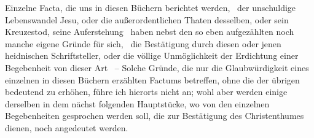 \begin{RWanm} 
Einzelne Facta, die uns in diesen Büchern berichtet werden, \zB\ der unschuldige Lebenswandel Jesu, oder die außerordentlichen Thaten desselben, oder sein Kreuzestod, seine Auferstehung \udgl\  haben nebst den so eben aufgezählten noch manche eigene Gründe für sich, \zB\ die Bestätigung durch diesen oder jenen heidnischen Schriftsteller, oder die völlige Unmöglichkeit der Erdichtung einer Begebenheit von dieser Art \udgl\  -- Solche Gründe, die nur die Glaubwürdigkeit eines einzelnen in diesen Büchern erzählten Factums betreffen, ohne die der übrigen bedeutend zu erhöhen, führe ich hierorts nicht an; wohl aber werden einige derselben in dem nächst folgenden Hauptstücke, wo von den einzelnen Begebenheiten gesprochen werden soll, die zur Bestätigung des Christenthumes dienen, noch angedeutet werden.
\end{RWanm}

